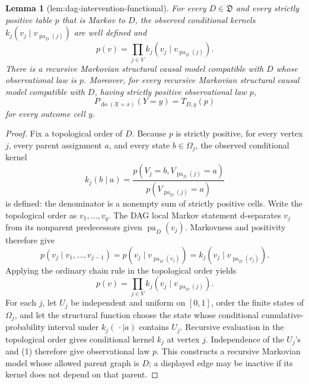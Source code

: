 \documentclass{article}
\newtheorem{lemma}{Lemma}
\begin{document}
\begin{lemma}[lem:dag-intervention-functional]\label{lem:dag-intervention-functional}
For every \(D\in\mathfrak D\) and every strictly positive table \(p\) that is Markov to \(D\), the observed conditional kernels \(k_j(v_j\mid v_{\operatorname{pa}_D(j)})\) are well defined and
\[
 p(v)=\prod_{j\in V}k_j(v_j\mid v_{\operatorname{pa}_D(j)}).
\]
There is a recursive Markovian structural causal model compatible with \(D\) whose observational law is \(p\).  Moreover, for every recursive Markovian structural causal model compatible with \(D\), having strictly positive observational law \(p\),
\[
 P_{\operatorname{do}(X=x)}(Y=y)=T_{D,y}(p)
\]
for every outcome cell \(y\).
\end{lemma}
\begin{proof}
Fix a topological order of \(D\).  Because \(p\) is strictly positive, for every vertex \(j\), every parent assignment \(a\), and every state \(b\in\Omega_j\), the observed conditional kernel
\[
 k_j(b\mid a)=\frac{p(V_j=b,V_{\operatorname{pa}_D(j)}=a)}
 {p(V_{\operatorname{pa}_D(j)}=a)}
\]
is defined: the denominator is a nonempty sum of strictly positive cells.  Write the topological order as \(v_1,\ldots,v_q\).  The DAG local Markov statement d-separates \(v_j\) from its nonparent predecessors given \(\operatorname{pa}_D(v_j)\).  Markovness and positivity therefore give
\[
 p(v_j\mid v_1,\ldots,v_{j-1})
 =p(v_j\mid v_{\operatorname{pa}_D(v_j)})
 =k_j(v_j\mid v_{\operatorname{pa}_D(v_j)}).
\]
Applying the ordinary chain rule in the topological order yields
\[
 p(v)=\prod_{j\in V}k_j(v_j\mid v_{\operatorname{pa}_D(j)}). \tag{1}
\]
For each \(j\), let \(U_j\) be independent and uniform on \([0,1]\), order the finite states of \(\Omega_j\), and let the structural function choose the state whose conditional cumulative-probability interval under \(k_j(\,\cdot\mid a)\) contains \(U_j\).  Recursive evaluation in the topological order gives conditional kernel \(k_j\) at vertex \(j\).  Independence of the \(U_j\)'s and (1) therefore give observational law \(p\).  This constructs a recursive Markovian model whose allowed parent graph is \(D\); a displayed edge may be inactive if its kernel does not depend on that parent.


\end{proof}
\end{document}

